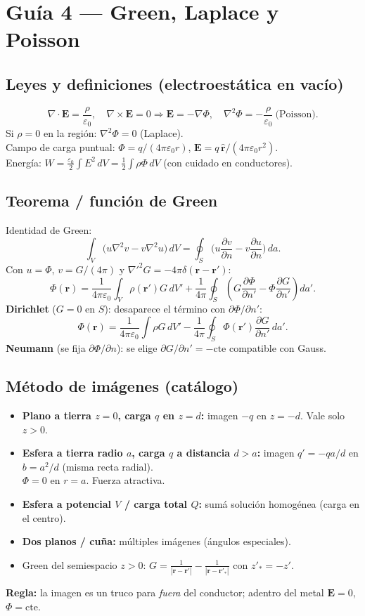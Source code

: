 \documentclass[10pt,a4paper]{article}
\newcommand{\vect}[1]{\mathbf{#1}}
\newcommand{\uv}[1]{\hat{\mathbf{#1}}}
\newcommand{\pd}[2]{\dfrac{\partial #1}{\partial #2}}
\newcommand{\epso}{\varepsilon_0}
\begin{document}
\section{Guía 4 --- Green, Laplace y Poisson}

\subsection{Leyes y definiciones (electroestática en vacío)}
\[
\nabla\cdot\vect{E}=\frac{\rho}{\epso},\quad
\nabla\times\vect{E}=0\Rightarrow\vect{E}=-\nabla\Phi,\quad
\nabla^2\Phi=-\frac{\rho}{\epso}\ \text{(Poisson)}.
\]
Si $\rho=0$ en la región: $\nabla^2\Phi=0$ (Laplace).\\
Campo de carga puntual: $\Phi=q/(4\pi\epso r)$, $\vect{E}=q\,\uv{r}/(4\pi\epso r^2)$.\\
Energía: $W=\frac{\epso}{2}\int E^2\,dV=\frac12\int\rho\Phi\,dV$ (con cuidado en conductores).

\subsection{Teorema / función de Green}
Identidad de Green:
\[
\int_V\!\big(u\nabla^2 v-v\nabla^2 u\big)\,dV=\oint_S\!\big(u\pd{v}{n}-v\pd{u}{n}\big)\,da.
\]
Con $u=\Phi$, $v=G/(4\pi)$ y $\nabla'^2 G=-4\pi\delta(\vect{r}-\vect{r}')$:
\[
\Phi(\vect{r})=\frac{1}{4\pi\epso}\int_V\rho(\vect{r}')G\,dV'
+\frac{1}{4\pi}\oint_S\!\left(G\pd{\Phi}{n'}-\Phi\pd{G}{n'}\right)da'.
\]
\textbf{Dirichlet} ($G=0$ en $S$): desaparece el término con $\partial\Phi/\partial n'$:
\[
\Phi(\vect{r})=\frac{1}{4\pi\epso}\int\rho G\,dV'-\frac{1}{4\pi}\oint_S\Phi(\vect{r}')\pd{G}{n'}\,da'.
\]
\textbf{Neumann} (se fija $\partial\Phi/\partial n$): se elige $\partial G/\partial n'=-\mathrm{cte}$ compatible con Gauss.

\subsection{Método de imágenes (catálogo)}
\begin{itemize}
\item \textbf{Plano a tierra $z=0$, carga $q$ en $z=d$:} imagen $-q$ en $z=-d$. Vale solo $z>0$.
\item \textbf{Esfera a tierra radio $a$, carga $q$ a distancia $d>a$:}
imagen $q'=-qa/d$ en $b=a^2/d$ (misma recta radial).\\
$\Phi=0$ en $r=a$. Fuerza atractiva.
\item \textbf{Esfera a potencial $V$ / carga total $Q$:} sumá solución homogénea (carga en el centro).
\item \textbf{Dos planos / cuña:} múltiples imágenes (ángulos especiales).
\item Green del semiespacio $z>0$: $G=\frac{1}{|\vect{r}-\vect{r}'|}-\frac{1}{|\vect{r}-\vect{r}'_*|}$ con $z'_*=-z'$.
\end{itemize}
\textbf{Regla:} la imagen es un truco para \emph{fuera} del conductor; adentro del metal $\vect{E}=0$, $\Phi=\mathrm{cte}$.
\end{document}
